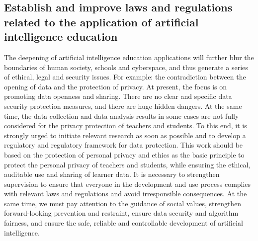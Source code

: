 \documentclass[lang=en,11pt,a4paper,towcolumn]{elegantpaper}
\begin{document}
{\subsection{Establish and improve laws and regulations related to the application of artificial intelligence education}
The deepening of artificial intelligence education applications will further blur the boundaries of human society, schools and cyberspace, and thus generate a series of ethical, legal and security issues. For example: the contradiction between the opening of data and the protection of privacy. At present, the focus is on promoting data openness and sharing. There are no clear and specific data security protection measures, and there are huge hidden dangers. At the same time, the data collection and data analysis results in some cases are not fully considered for the privacy protection of teachers and students. To this end, it is strongly urged to initiate relevant research as soon as possible and to develop a regulatory and regulatory framework for data protection. This work should be based on the protection of personal privacy and ethics as the basic principle to protect the personal privacy of teachers and students, while ensuring the ethical, auditable use and sharing of learner data. It is necessary to strengthen supervision to ensure that everyone in the development and use process complies with relevant laws and regulations and avoid irresponsible consequences. At the same time, we must pay attention to the guidance of social values, strengthen forward-looking prevention and restraint, ensure data security and algorithm fairness, and ensure the safe, reliable and controllable development of artificial intelligence.

}
\end{document}
